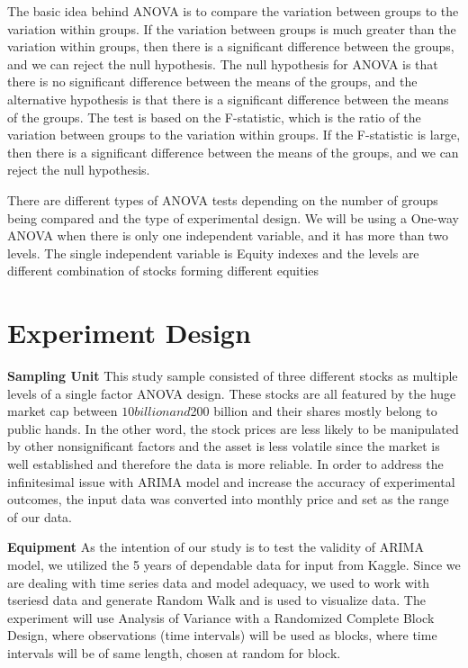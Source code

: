 \documentclass{article}[12pt]
\begin{document}
        The basic idea behind ANOVA is to compare the variation between groups to the variation within groups. If the variation between groups is much greater than the variation within groups, then there is a significant difference between the groups, and we can reject the null hypothesis. The null hypothesis for ANOVA is that there is no significant difference between the means of the groups, and the alternative hypothesis is that there is a significant difference between the means of the groups. The test is based on the F-statistic, which is the ratio of the variation between groups to the variation within groups. If the F-statistic is large, then there is a significant difference between the means of the groups, and we can reject the null hypothesis.
        
        There are different types of ANOVA tests depending on the number of groups being compared and the type of experimental design. We will be using a One-way ANOVA when there is only one independent variable, and it has more than two levels. The single independent variable is Equity indexes and the levels are different combination of stocks forming different equities
        
    \section{Experiment Design}

    \textbf{Sampling Unit} 
    This study sample consisted of three different stocks as multiple levels of a single factor ANOVA design. These stocks are all featured by the huge market cap between $10 billion and $200 billion and their shares mostly belong to public hands. In the other word, the stock prices are less likely to be manipulated by other nonsignificant factors and the asset is less volatile since the market is well established and therefore the data is more reliable. In order to address the infinitesimal issue with ARIMA model and increase the accuracy of experimental outcomes, the input data was converted into monthly price and set as the range of our data.
    
    \textbf{Equipment}
    As the intention of our study is to test the validity of ARIMA model, we utilized the 5 years of dependable data for input from Kaggle. Since we are dealing with time series data and model adequacy, we used  to work with tseriesd data and generate Random Walk and  is used to visualize data. The experiment will use Analysis of Variance with a Randomized Complete Block Design, where observations (time intervals) will be used as blocks, where time intervals will be of same length, chosen at random for block.
\end{document}
